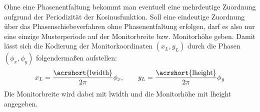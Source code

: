 Ohne eine Phasenentfaltung bekommt man eventuell eine mehrdeutige Zuordnung aufgrund der Periodizität der Kosinusfunktion.
Soll eine eindeutige Zuordnung über das Phasenschiebeverfahren ohne Phasenentfaltung erfolgen, darf es also nur eine einzige Musterperiode auf der Monitorbreite bzw. Monitorhöhe geben.
Damit lässt sich die Kodierung der Monitorkoordinaten $(x_{L}, y_{L})$ durch die Phasen $(\phi_{x}, \phi_{y})$ folgendermaßen aufstellen:
\begin{equation}\label{eq:phasenkodierung}
	x_{L} = \dfrac{\text{\acrshort{lwidth}}}{2\pi}\phi_{x},
	\qquad
	y_{L} = \dfrac{\text{\acrshort{lheight}}}{2\pi}\phi_{y}
\end{equation}
%
\noindent
Die Monitorbreite wird dabei mit \acrshort{lwidth} und die Monitorhöhe mit \acrshort{lheight} angegeben.

